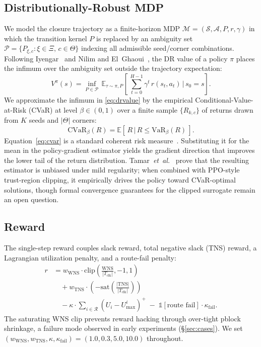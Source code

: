 \documentclass[journal]{IEEEtran}
\begin{document}
\subsection{Distributionally-Robust MDP}
We model the closure trajectory as a finite-horizon MDP $\mathcal{M} = (\mathcal{S}, \mathcal{A}, P, r, \gamma)$ in which the transition kernel $P$ is replaced by an ambiguity set $\mathcal{P} = \{P_{\xi,c} : \xi \in \Xi,\, c \in \Theta\}$ indexing all admissible seed/corner combinations. Following Iyengar~\cite{iyengar2005robust} and Nilim and El~Ghaoui~\cite{nilim2005robust}, the DR value of a policy $\pi$ places the infimum over the ambiguity set outside the trajectory expectation:
\begin{equation}
V^{\pi}(s) = \inf_{P \in \mathcal{P}}\, \mathbb{E}_{\tau \sim \pi, P}\!\left[\, \sum_{t=0}^{H-1} \gamma^{t}\, r(s_t, a_t)\, \Big|\, s_0 = s \right].
\label{eq:drvalue}
\end{equation}
We approximate the infimum in \eqref{eq:drvalue} by the empirical Conditional-Value-at-Risk (CVaR) at level $\beta \in (0,1)$ over a finite sample $\{R_{k,c}\}$ of returns drawn from $K$ seeds and $|\Theta|$ corners:
\begin{equation}
\mathrm{CVaR}_{\beta}(R) = \mathbb{E}\!\left[\, R \,\big|\, R \leq \mathrm{VaR}_{\beta}(R)\, \right].
\label{eq:cvar}
\end{equation}
Equation~\eqref{eq:cvar} is a standard coherent risk measure~\cite{tamar2015cvar}. Substituting it for the mean in the policy-gradient estimator yields the gradient direction that improves the lower tail of the return distribution. Tamar~\emph{et~al.}~\cite{tamar2015cvar} prove that the resulting estimator is unbiased under mild regularity; when combined with PPO-style trust-region clipping, it empirically drives the policy toward CVaR-optimal solutions, though formal convergence guarantees for the clipped surrogate remain an open question.

\subsection{Reward}
The single-step reward couples slack reward, total negative slack (TNS) reward, a Lagrangian utilization penalty, and a route-fail penalty:
\begin{align}
r &= w_{\text{WNS}} \cdot \mathrm{clip}\!\left(\frac{\mathrm{WNS}}{|T_{\text{clk}}|}, -1, 1\right) \nonumber \\
  &\quad + w_{\text{TNS}} \cdot \left( -\mathrm{sat}\!\left(\frac{|\mathrm{TNS}|}{|T_{\text{clk}}|}\right)\right) \nonumber \\
  &\quad - \kappa \cdot \sum_{i \in \mathcal{R}} (U_i - U_{\max}^{i})^{+} \;-\; \mathbb{1}[\text{route fail}] \cdot \kappa_{\text{fail}}.
\label{eq:reward}
\end{align}
The saturating WNS clip prevents reward hacking through over-tight pblock shrinkage, a failure mode observed in early experiments (\S\ref{sec:cases}). We set $(w_{\text{WNS}}, w_{\text{TNS}}, \kappa, \kappa_{\text{fail}}) = (1.0, 0.3, 5.0, 10.0)$ throughout.
\end{document}
